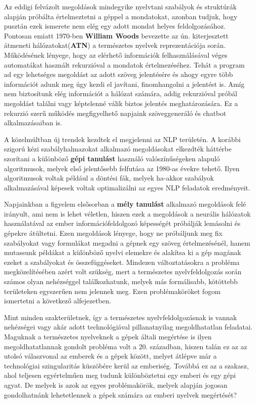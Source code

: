 Az eddigi felvázolt megoldások mindegyike nyelvtani szabályok és struktúrák alapján próbálta értelmeztetni a géppel a mondatokat, azonban tudjuk, hogy pusztán ezek ismerete nem elég egy adott mondat helyes feldolgozásához. Pontosan emiatt 1970-ben \textbf{William Woods} bevezette az ún. kiterjesztett átmeneti hálózatokat(\textbf{ATN}) a természetes nyelvek reprezentációja során.\cite{atn} Működésének lényege, hogy az elérhető információk felhasználásával véges automatákat használt rekurzióval a mondatok értelmezéséhez. Tehát a program ad egy lehetséges megoldást az adott szöveg jelentésére és ahogy egyre több információt adunk meg úgy kezdi el javítani, finomhangolni a jelentést is. Amíg nem biztosítunk elég információt a hálózat számára, addig rekurzióval próbál megoldást találni vagy képtelenné válik biztos jelentés meghatározására. Ez a rekurzió szerű működés megfigyelhető napjaink szöveggeneráló és chatbot alkalmazásaiban is.

A közelmúltban új trendek kezdtek el megjelenni az NLP területén. A korábbi szigorú kézi szabályhalmazokat alkalmazó megoldásokat elkezdték háttérbe szorítani a különböző \textbf{gépi tanulást} használó valószínűségeken alapuló algoritmusok, melyek első jelentősebb felfutása az 1980-as évekre tehető. Ilyen algoritmusok voltak például a döntési fák, melyek ha-akkor szabályok alkalmazásával képesek voltak optimalizálni az egyes NLP feladatok eredményeit.

Napjainkban a figyelem elsősorban a \textbf{mély tanulást} alkalmazó megoldások felé irányult, ami nem is lehet véletlen, hiszen ezek a megoldások a neurális hálózatok használatával az ember információfeldolgozó képességét próbálják lemásolni és gépekre átültetni. Ezen megoldások lényege, hogy ne próbáljunk meg fix szabályokat vagy formulákat megadni a gépnek egy szöveg értelmezésénél, hanem mutassunk példákat a különböző nyelvi elemekre és alakítsa ki a gép magának ezeket a szabályokat és összefüggéseket. Mindezen változtatásokra a probléma megközelítésében azért volt szükség, mert a természetes nyelvfeldolgozás során számos olyan nehézséggel találkozhatunk, melyek más formálisabb, kötöttebb területeken egyszerűen nem jelennek meg. Ezen problémaköröket fogom ismertetni a következő alfejezetben.


Mint minden szakterületnek, így a természetes nyelvfeldolgozásnak is vannak nehézségei vagy akár adott technológiával pillanatnyilag megoldhatatlan feladatai. Maguknak a természetes nyelveknek a gépek általi megértése is ilyen megoldhatatlannak gondolt probléma volt a 20. században, hiszen talán ez az az utolsó válaszvonal az emberek és a gépek között, melyet átlépve már a technológiai szingularitás küszöbére kerül az emberiség. Továbbá ez az a szakasz, ahol teljesen egyértelműen meg tudunk különböztetni egy emberi és egy gépi agyat. De melyek is azok az egyes problémakörök, melyek alapján jogosan gondolhatnánk lehetetlennek a gépek számára az emberi nyelvek megértését?

